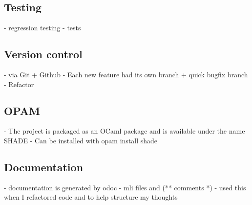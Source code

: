 \documentclass[class=article, crop=false]{standalone}
\begin{document}
\subsection{Testing}
- regression testing
- tests

\subsection{Version control}
- via Git + Github
- Each new feature had its own branch + quick bugfix branch
- Refactor

\subsection{OPAM}
- The project is packaged as an OCaml package and is available under the name SHADE
- Can be installed with opam install shade

\subsection{Documentation}
- documentation is generated by odoc
- mli files and (** comments *)
- used this when I refactored code and to help structure my thoughts
\end{document}
